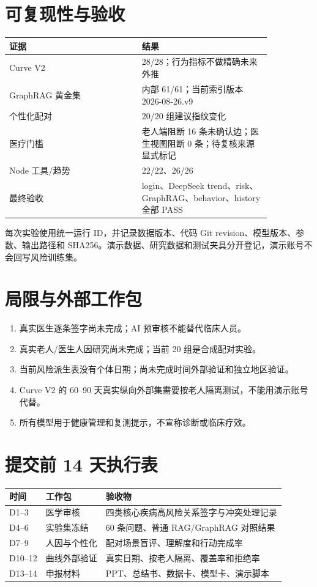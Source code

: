 \documentclass[UTF8,a4paper,zihao=-4]{ctexart}
\begin{document}
\section{可复现性与验收}
\begin{longtable}{p{0.43\linewidth}p{0.42\linewidth}}
\toprule 证据 & 结果\\\midrule
Curve V2 & 28/28；行为指标不做精确未来外推\\
GraphRAG 黄金集 & 内部 61/61；当前索引版本 2026-08-26.v9\\
个性化配对 & 20/20 组建议指纹变化\\
医疗门槛 & 老人端阻断 16 条未确认边；医生视图阻断 0 条；待复核来源显式标记\\
Node 工具/趋势 & 22/22、26/26\\
最终验收 & login、DeepSeek trend、risk、GraphRAG、behavior、history 全部 PASS\\
\bottomrule
\end{longtable}

每次实验使用统一运行 ID，并记录数据版本、代码 Git revision、模型版本、参数、输出路径和 SHA256。演示数据、研究数据和测试夹具分开登记，演示账号不会回写风险训练集。

\section{局限与外部工作包}
\begin{enumerate}
\item 真实医生逐条签字尚未完成；AI 预审核不能替代临床人员。
\item 真实老人/医生人因研究尚未完成；当前 20 组是合成配对实验。
\item 当前风险派生表没有个体日期；尚未完成时间外部验证和独立地区验证。
\item Curve V2 的 60--90 天真实纵向外部集需要按老人隔离测试，不能用演示账号代替。
\item 所有模型用于健康管理和复测提示，不宣称诊断或临床疗效。
\end{enumerate}

\section{提交前 14 天执行表}
\scriptsize
\begin{tabular}{p{1.6cm}p{2.3cm}p{9.2cm}}
\toprule 时间 & 工作包 & 验收物\\\midrule
D1--3 & 医学审核 & 四类核心疾病高风险关系签字与冲突处理记录\\
D4--6 & 实验集冻结 & 60 条问题、普通 RAG/GraphRAG 对照结果\\
D7--9 & 人因与个性化 & 配对场景盲评、理解度和行动完成率\\
D10--12 & 曲线外部验证 & 真实日期、按老人隔离、覆盖率和拒绝率\\
D13--14 & 申报材料 & PPT、总结书、数据卡、模型卡、演示脚本\\
\bottomrule
\end{tabular}
\end{document}
